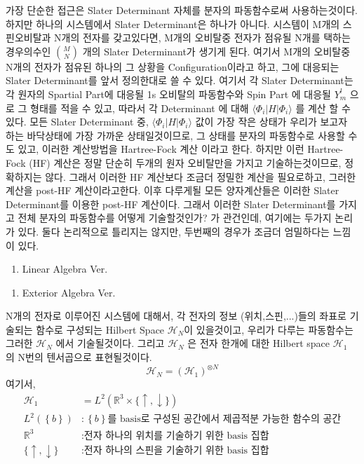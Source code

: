 \documentclass[10pt]{article}
\begin{document}
가장 단순한 접근은 Slater Determinant 자체를 분자의 파동함수로써 사용하는것이다. 
하지만 하나의 시스템에서 Slater Determinant은 하나가 아니다. 
시스템이 M개의 스핀오비탈과 N개의 전자를 갖고있다면,  M개의 오비탈중 전자가 점유될 N개를 택하는 경우의수인 \(\binom{M}{N}\) 개의 Slater Determinant가 생기게 된다. 
여기서 M개의 오비탈중 N개의 전자가 점유된 하나의 그 상황을 Configuration이라고 하고, 그에 대응되는 Slater Determinant를 앞서 정의한대로 쓸 수 있다. 
여기서 각 Slater Determinant는 각 원자의 Spartial Part에 대응될 1s 오비탈의 파동함수와 Spin Part 에 대응될 \(Y^l_m\) 으로 그 형태를 적을 수 있고, 따라서 각 Determinant 에 대해 \(\langle \Phi_i|H|\Phi_i \rangle\) 를 계산 할 수 있다. 
모든 Slater Determinant 중, \(\langle \Phi_i|H|\Phi_i \rangle\) 값이 가장 작은 상태가 우리가 보고자 하는 바닥상태에 가장 가까운 상태일것이므로, 그 상태를 분자의 파동함수로 사용할 수도 있고, 
이러한 계산방법을 Hartree-Fock 계산 이라고 한다. 
하지만 이런 Hartree-Fock (HF) 계산은 정말 단순히 두개의 원자 오비탈만을 가지고 기술하는것이므로, 정확하지는 않다. 그래서 이러한 HF 계산보다 조금더 정밀한 계산을 필요로하고, 그러한 계산을 post-HF 계산이라고한다. 
이후 다루게될 모든 양자계산들은 이러한 Slater Determinant를 이용한 post-HF 계산이다. 
그래서 이러한 Slater Determinant를 가지고 전체 분자의 파동함수를 어떻게 기술할것인가? 가 관건인데, 여기에는 두가지 논리가 있다. 둘다 논리적으로 틀리지는 않지만, 두번째의 경우가 조금더 엄밀하다는 느낌이 있다. 

\begin{enumerate}[label=\(\mathrm{i}\))]
\item {Linear Algebra Ver.}

\end{enumerate}

\begin{enumerate}[label=\(\mathrm{ii}\))]
\item {Exterior Algebra Ver.}

\end{enumerate}



N개의 전자로 이루어진 시스템에 대해서, 각 전자의 정보 (위치,스핀,...)들의 좌표로 기술되는 함수로 구성되는 Hilbert Space \(\mathcal{H}_N\)이 있을것이고, 우리가 다루는 파동함수는 그러한 \(\mathcal{H}_N\) 에서 기술될것이다. 
그리고 \(\mathcal{H}_N\) 은 전자 한개에 대한 Hilbert space \(\mathcal{H}_1\) 의 N번의 텐서곱으로 표현될것이다. 
\[
\mathcal{H}_N = (\mathcal{H}_1)^{\otimes N}
\]
여기서,
\begin{align*}
\mathcal{H}_1 &=  L^2(\mathbb{R}^3 \times \{\uparrow, \downarrow\}) \\
L^2 (\left\{b\right\}) &: \left\{b\right\} \text{를 basis로 구성된 공간에서 제곱적분 가능한 함수의 공간} \\
\mathbb{R}^3 &: \text{전자 하나의 위치를 기술하기 위한 basis 집합}\\
\{\uparrow, \downarrow\} &: \text{전자 하나의 스핀을 기술하기 위한 basis 집합}
\end{align*}
\end{document}
